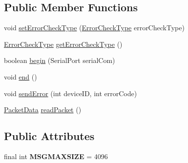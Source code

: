 \subsection*{Public Member Functions}
\begin{DoxyCompactItemize}
\item 
void \hyperlink{class_a_m_a_s_p_java_1_1_a_m_a_s_p_serial_ac5c88aa9168fb1e962705a47f86c9f3d}{set\+Error\+Check\+Type} (\hyperlink{enum_a_m_a_s_p_java_1_1_a_m_a_s_p_serial_1_1_error_check_type}{Error\+Check\+Type} error\+Check\+Type)
\item 
\hyperlink{enum_a_m_a_s_p_java_1_1_a_m_a_s_p_serial_1_1_error_check_type}{Error\+Check\+Type} \hyperlink{class_a_m_a_s_p_java_1_1_a_m_a_s_p_serial_abe2bbc035a6337e7b04ea9e6a0498ced}{get\+Error\+Check\+Type} ()
\item 
boolean \hyperlink{class_a_m_a_s_p_java_1_1_a_m_a_s_p_serial_ae1706e1eae0bcc63b42229e70b3f8c04}{begin} (Serial\+Port serial\+Com)
\item 
void \hyperlink{class_a_m_a_s_p_java_1_1_a_m_a_s_p_serial_a86f80b182b170fee48a6f13a3672c032}{end} ()
\item 
void \hyperlink{class_a_m_a_s_p_java_1_1_a_m_a_s_p_serial_a33ea416e78a67d007dbe2ab9326205e6}{send\+Error} (int device\+ID, int error\+Code)
\item 
\hyperlink{class_a_m_a_s_p_java_1_1_a_m_a_s_p_serial_1_1_packet_data}{Packet\+Data} \hyperlink{class_a_m_a_s_p_java_1_1_a_m_a_s_p_serial_a0770b15ce35cf5a58ae6f1949c1588c9}{read\+Packet} ()
\end{DoxyCompactItemize}
\subsection*{Public Attributes}
\begin{DoxyCompactItemize}
\item 
\mbox{\label{class_a_m_a_s_p_java_1_1_a_m_a_s_p_serial_a9795622c94c823f551d2184ea3aa828c}} 
final int {\bfseries M\+S\+G\+M\+A\+X\+S\+I\+ZE} = 4096
\end{DoxyCompactItemize}
